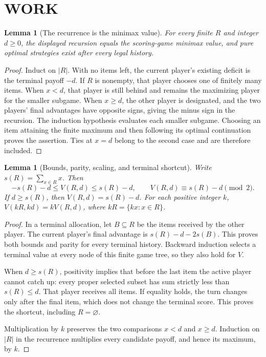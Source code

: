 \documentclass[11pt,a4paper]{article}
\newtheorem{lemma}[theorem]{Lemma}
\theoremstyle{definition}\newtheorem{definition}[theorem]{Definition}
\theoremstyle{remark}\newtheorem{remark}[theorem]{Remark}
\newcommand{\1}{\mathbf 1}
\begin{document}
\section{WORK}
\begin{lemma}[The recurrence is the minimax value]\label{lem:dp}
For every finite $R$ and integer $d\ge0$, the displayed recursion equals the scoring-game minimax value, and pure optimal strategies exist after every legal history.
\end{lemma}
\begin{proof}
Induct on $|R|$. With no items left, the current player's existing deficit is the terminal payoff $-d$. If $R$ is nonempty, that player chooses one of finitely many items. When $x<d$, that player is still behind and remains the maximizing player for the smaller subgame. When $x\ge d$, the other player is designated, and the two players' final advantages have opposite signs, giving the minus sign in the recursion. The induction hypothesis evaluates each smaller subgame. Choosing an item attaining the finite maximum and then following its optimal continuation proves the assertion. Ties at $x=d$ belong to the second case and are therefore included.
\end{proof}

\begin{lemma}[Bounds, parity, scaling, and terminal shortcut]\label{lem:invariants}
Write $s(R)=\sum_{x\in R}x$. Then
\[
 -s(R)-d\le V(R,d)\le s(R)-d,\qquad
 V(R,d)\equiv s(R)-d\pmod2.
\]
If $d\ge s(R)$, then $V(R,d)=s(R)-d$. For each positive integer $k$,
$V(kR,kd)=kV(R,d)$, where $kR=\{kx:x\in R\}$.
\end{lemma}
\begin{proof}
In a terminal allocation, let $B\subseteq R$ be the items received by the other player. The current player's final advantage is
$s(R)-d-2s(B)$. This proves both bounds and parity for every terminal history. Backward induction selects a terminal value at every node of this finite game tree, so they also hold for $V$.

When $d\ge s(R)$, positivity implies that before the last item the active player cannot catch up: every proper selected subset has sum strictly less than $s(R)\le d$. That player receives all items. If equality holds, the turn changes only after the final item, which does not change the terminal score. This proves the shortcut, including $R=\varnothing$.

Multiplication by $k$ preserves the two comparisons $x<d$ and $x\ge d$. Induction on $|R|$ in the recurrence multiplies every candidate payoff, and hence its maximum, by $k$.
\end{proof}
\end{document}
